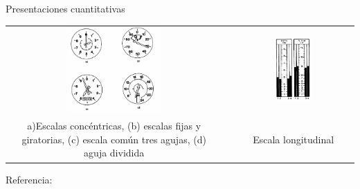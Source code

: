 \begin{frame}{Presentaciones cuantitativas
	}

  \begin{tabular}{ccc}
    \includegraphics[width=0.45\textwidth]{imagenes/1.2.clasificacion.instrumentos/escala_gran_alcance.png} & \hspace{3mm}
&     \includegraphics[width=0.35\textwidth]{imagenes/1.2.clasificacion.instrumentos/longitudinal.png}
\\
\parbox{0.45\textwidth}{\small a)Escalas conc\'entricas, (b) escalas fijas y giratorias, (c) escala com\'un tres agujas, (d) aguja dividida}
&
& {\small Escala longitudinal}
\\
  \end{tabular}
{\tiny Referencia: \cite{pallett1992aircraft}}
\end{frame}

